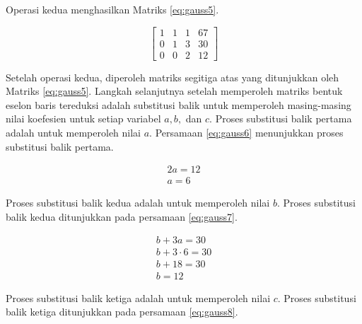 \begin{flushleft}
	Operasi kedua menghasilkan Matriks \ref{eq:gauss5}.
\end{flushleft}

\begin{center}
	\setlength\arraycolsep{10pt}
	\begin{equation}
		\begin{bmatrix}
				1 	& 1 	& 1 	& 67 		\\[1em]
				0 	& 1 	& 3 	& 30 		\\[1em]
				0 	& 0 	& 2 	& 12
		\end{bmatrix}
		\label{eq:gauss5}
	\end{equation}
\end{center}

Setelah operasi kedua, diperoleh matriks segitiga atas yang ditunjukkan oleh Matriks \ref{eq:gauss5}. Langkah selanjutnya setelah memperoleh matriks bentuk eselon baris tereduksi adalah substitusi balik untuk memperoleh masing-masing nilai koefesien untuk setiap variabel \begin{math}a, b,\end{math} dan \begin{math}c\end{math}. Proses substitusi balik pertama adalah untuk memperoleh nilai \begin{math}a\end{math}. Persamaan \ref{eq:gauss6} menunjukkan proses substitusi balik pertama.

\begin{align}
	2a = 12 \nonumber \\
	a = 6 \label{eq:gauss6}
\end{align}

Proses substitusi balik kedua adalah untuk memperoleh nilai \begin{math}b\end{math}. Proses substitusi balik kedua ditunjukkan pada persamaan \ref{eq:gauss7}.

\begin{align}
	b + 3a = 30 \nonumber \\
	b + 3\cdot6 = 30 \nonumber \\
	b + 18 = 30 \nonumber \\
	b = 12 \label{eq:gauss7}
\end{align}

Proses substitusi balik ketiga adalah untuk memperoleh nilai \begin{math}c\end{math}. Proses substitusi balik ketiga ditunjukkan pada persamaan \ref{eq:gauss8}.

